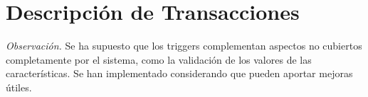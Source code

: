 \chapter{Descripción de Transacciones}

\textit{Observación.} Se ha supuesto que los triggers complementan aspectos no cubiertos completamente por el sistema, como la validación de los valores de las características. Se han implementado considerando que pueden aportar mejoras útiles.





